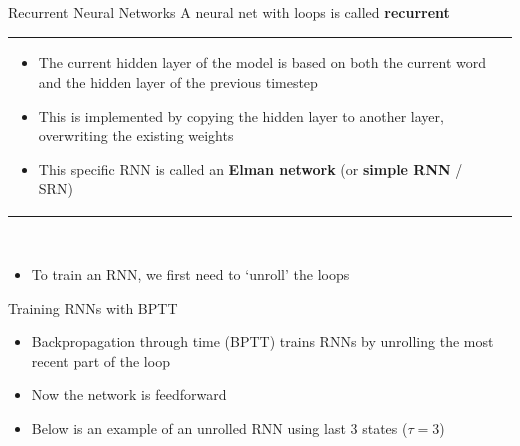 \documentclass[xcolor=pdftex,x11names,table,hyperref]{beamer}
\newcommand{\detail}[1]{{\color{lightgrey}\small{}#1}}
\begin{document}
\begin{frame}{Recurrent Neural Networks}
\hspace*{-1.0em} A neural net with loops is called \textbf{recurrent} \\[1.0em]
\pause

\hspace*{-3.0em}%
\begin{tabular}{p{}p{}}
\begin{minipage}{0.6\textwidth}
\begin{itemize}
	\item The current hidden layer of the model is based on both the current word and the hidden layer of the previous timestep
	\item This is implemented by copying the hidden layer to another layer, overwriting the existing weights
	\item This specific RNN is called an \textbf{Elman network} (or \textbf{simple RNN} / SRN)
\end{itemize}
\end{minipage}
 & 
\begin{minipage}{1.0\textwidth}
\begin{tiny}

\end{tiny}
\end{minipage}
\end{tabular} \\[1.0em]


\hspace*{-2.5em}%
\begin{minipage}{1.0\textwidth}
\begin{itemize}
	\item To train an RNN, we first need to `unroll' the loops
\end{itemize}
\end{minipage}
\end{frame}



\begin{frame}{Training RNNs with BPTT}
\begin{itemize}
	\item Backpropagation through time (BPTT) trains RNNs by unrolling the most recent part of the loop
	\item Now the network is feedforward
	\item {\small Below is an example of an unrolled RNN using last 3 states \detail{($\tau = 3$)} }
\end{itemize}

\vspace*{0.5em}

\begin{tiny}
\scalebox{0.94}{%

}
\end{tiny}
\end{frame}
\end{document}
